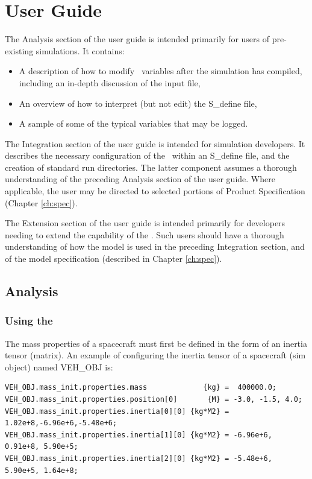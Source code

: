 \chapter{User Guide}\label{ch:user}
The Analysis section of the user guide is intended primarily for users of pre-existing simulations.  
It contains: 
\begin{itemize}
\item A description of how to modify \gravitytorqueDesc\ variables after the simulation 
has compiled, including an in-depth discussion of the input file,
\item An overview of how to interpret (but not edit) the S\_define file,
\item A sample of some of the typical variables that may be logged.
\end{itemize}

The Integration section of the user guide is intended for simulation developers.  
It describes the necessary configuration of the \gravitytorqueDesc\ within an 
S\_define file, and the creation of standard run directories.  The latter 
component assumes a thorough understanding of the preceding Analysis section of the user guide.
Where applicable, the user may be directed to selected portions of Product Specification (Chapter \ref{ch:spec}).

The Extension section of the user guide is intended primarily for developers 
needing to extend the capability of the \gravitytorqueDesc.  Such users should have a 
thorough understanding of how the model is used in the preceding 
Integration section, and of the model 
specification (described in Chapter \ref{ch:spec}).

\section{Analysis}

\subsection{Using the \gravitytorqueDesc\ }
The mass properties of a spacecraft must
first be defined in the form of an inertia tensor (matrix).  An example of 
configuring the inertia tensor of a spacecraft (sim object) named VEH\_OBJ is:
\begin{verbatim}
VEH_OBJ.mass_init.properties.mass             {kg} =  400000.0;
VEH_OBJ.mass_init.properties.position[0]       {M} = -3.0, -1.5, 4.0;
VEH_OBJ.mass_init.properties.inertia[0][0] {kg*M2} =  1.02e+8,-6.96e+6,-5.48e+6;
VEH_OBJ.mass_init.properties.inertia[1][0] {kg*M2} = -6.96e+6, 0.91e+8, 5.90e+5;
VEH_OBJ.mass_init.properties.inertia[2][0] {kg*M2} = -5.48e+6, 5.90e+5, 1.64e+8;
\end{verbatim}


